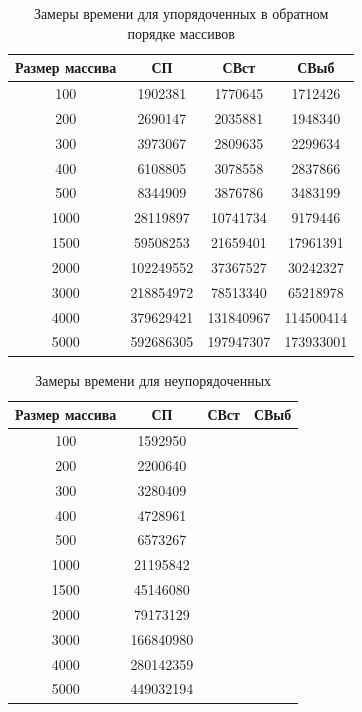 \documentclass[12pt]{report}
\begin{document}
\begin{table}[h]
	\begin{center}
		\caption{\label{time2} Замеры времени для упорядоченных в обратном порядке массивов}
		\begin{tabular}{|c c c c|} 
 			\hline
			Размер массива & СП & СВст & СВыб \\ [0.5ex] 
 			\hline\hline
 			100 & 1902381 & 1770645 & 1712426\\
 			\hline
 			200 & 2690147 & 2035881 & 1948340\\
 			\hline
			300 & 3973067 & 2809635 & 2299634\\
			\hline
			400 & 6108805 & 3078558 & 2837866\\
			\hline
			500 & 8344909 & 3876786 & 3483199\\
			\hline
			1000 & 28119897 & 10741734 & 9179446\\
			\hline
			1500 & 59508253 & 21659401 & 17961391\\
			\hline
			2000 & 102249552 & 37367527 & 30242327\\
			\hline
			3000 & 218854972 & 78513340 & 65218978\\
			\hline
			4000 & 379629421 & 131840967 & 114500414\\
			\hline
			5000 & 592686305 & 197947307	& 173933001\\
			\hline
			\end{tabular}
	\end{center}
\end{table}

\begin{table}[h]
	\begin{center}
		\caption{\label{time3} Замеры времени для неупорядоченных}
		\begin{tabular}{|c c c c|} 
 			\hline
			Размер массива & СП & СВст & СВыб \\ [0.5ex] 
 			\hline\hline
 			100 & 1592950 & & \\
 			\hline
 			200 & 2200640 & & \\
 			\hline
			300 & 3280409 & & \\
			\hline
			400 & 4728961 & & \\
			\hline
			500 & 6573267 &  & \\
			\hline
			1000 & 21195842 &  & \\
			\hline
			1500 & 45146080 &  & \\
			\hline
			2000 & 79173129 &  & \\
			\hline
			3000 & 166840980 &  & \\
			\hline
			4000 & 280142359 &  & \\
			\hline
			5000 & 449032194 &  	& \\
			\hline
			\end{tabular}
	\end{center}
\end{table}
\end{document}
